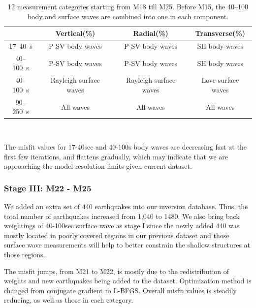 \documentclass[extra,mreferee]{gji}
\begin{document}
\begin{table}[!htb]
  \centering
  \begin{tabular}{|c|c|c|c|}
    \hline
    ~          &  Vertical(\%) & Radial(\%) &  Transverse(\%) \\
    \hline
    17--40~s   &   P-SV body waves          & P-SV body waves           & SH body waves   \\
    40--100~s  &   P-SV body waves          & P-SV body waves           & SH body waves \\
    40--100~s  &   Rayleigh surface waves   & Rayleigh surface waves    & Love surface waves \\
    90--250~s  &   All waves                & All waves                 & All waves \\
    \hline
  \end{tabular}\\
  \caption{12 measurement categories starting from M18 till M25. Before M15, the 40--100 body and surface waves are combined into one in each component.}
  \label{table:measurement_category}
\end{table}



The misfit values for 17-40sec and 40-100s body waves are decreasing fast at
the first few iterations, and flattens gradually, which may indicate that we are
approaching the model resolution limits given current dataset.

\subsubsection{Stage III: M22 - M25}

We added an extra set of 440 earthquakes into our inversion database. Thus, the total
number of earthquakes increased from 1,040 to 1480. We also bring back weightings
of 40-100sec surface wave as stage I since the newly added 440 was mostly located
in poorly covered regions in our previous dataset and those surface wave measurements
will help to better constrain the shallow structures at those regions.

The misfit jumps, from M21 to M22, is mostly due to the redistribution of weights
and new earthquakes being added to the dataset. Optimization method is changed
from conjugate gradient to L-BFGS. Overall misfit values is steadily reducing,
as well as those in each category.
\end{document}

